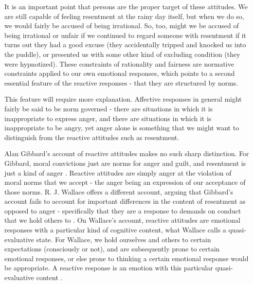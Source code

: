 \documentclass[phd,12pt,oneside,paper=letterpaper]{ubcthesis}
\begin{document}
It is an important point that persons are the proper target of these attitudes. We are still capable of feeling resentment at the rainy day itself, but when we do so, we would fairly be accused of being irrational. So, too, might we be accused of being irrational or unfair if we continued to regard someone with resentment if it turns out they had a good excuse (they accidentally tripped and knocked us into the puddle), or presented us with some other kind of excluding condition (they were hypnotized). These constraints of rationality and fairness are normative constraints applied to our own emotional responses, which points to a second essential feature of the reactive responses - that they are structured by norms.

This feature will require more explanation. Affective responses in general might fairly be said to be norm governed - there are situations in which it is inappropriate to express anger, and there are situations in which it is inappropriate to be angry, yet anger alone is something that we might want to distinguish from the reactive attitudes such as resentment. 

Alan Gibbard's account of reactive attitudes makes no such sharp distinction. For Gibbard, moral convictions just are norms for anger and guilt, and resentment is just a kind of anger \citep[p.126]{Gibbard1990}. Reactive attitudes are simply anger at the violation of moral norms that we accept - the anger being an expression of our acceptance of those norms. R. J. Wallace offers a different account, arguing that Gibbard's account fails to account for important differences in the content of resentment as opposed to anger - specifically that they are a response to demands on conduct that we hold others to \citep[p.49]{wallace1994}. On Wallace's account, reactive attitudes are emotional responses with a particular kind of cognitive content, what Wallace calls a quasi-evaluative state. For Wallace, we hold ourselves and others to certain expectations (consciously or not), and are subsequently prone to certain emotional responses, or else prone to thinking a certain emotional response would be appropriate. A reactive response is an emotion with this particular quasi-evaluative content \citep[p.49]{wallace1994}.
\end{document}
